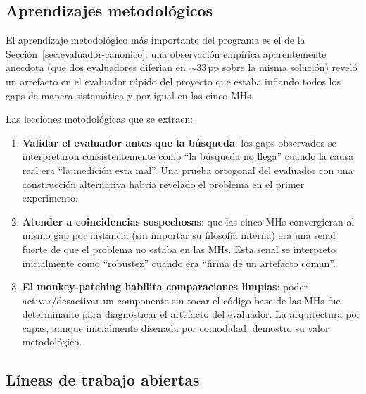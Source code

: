 \subsection{Aprendizajes metodológicos}

El aprendizaje metodológico más importante del programa es el de la
Sección~\ref{sec:evaluador-canonico}: una observación empírica
aparentemente anecdota (que dos evaluadores diferian en $\sim 33$\,pp
sobre la misma solución) reveló un artefacto en el evaluador rápido
del proyecto que estaba inflando todos los gaps de manera sistemática
y por igual en las cinco MHs.

Las lecciones metodológicas que se extraen:

\begin{enumerate}
\item \textbf{Validar el evaluador antes que la búsqueda}: los gaps
  observados se interpretaron consistentemente como ``la búsqueda no
  llega'' cuando la causa real era ``la medición esta mal''. Una
  prueba ortogonal del evaluador con una construcción alternativa
  habría revelado el problema en el primer experimento.
\item \textbf{Atender a coincidencias sospechosas}: que las cinco
  MHs convergieran al mismo gap por instancia (sin importar su
  filosofía interna) era una senal fuerte de que el problema no
  estaba en las MHs. Esta senal se interpreto inicialmente como
  ``robustez'' cuando era ``firma de un artefacto comun''.
\item \textbf{El monkey-patching habilita comparaciones limpias}:
  poder activar/desactivar un componente sin tocar el código base de
  las MHs fue determinante para diagnosticar el artefacto del
  evaluador. La arquitectura por capas, aunque inicialmente disenada
  por comodidad, demostro su valor metodológico.
\end{enumerate}

\subsection{Líneas de trabajo abiertas}

